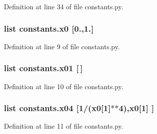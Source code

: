 Definition at line 34 of file constants.\-py.

\hypertarget{namespaceconstants_a8bd1a0146a51ce5d2a094e0390ad9d6e}{
\subsubsection[{x0}]{\setlength{\rightskip}{0pt plus 5cm}list constants.\-x0 \mbox{[}0.,1.\mbox{]}}}\label{namespaceconstants_a8bd1a0146a51ce5d2a094e0390ad9d6e}


Definition at line 9 of file constants.\-py.

\hypertarget{namespaceconstants_aba7f89394c33cc1f4a503e8e7717fd15}{
\subsubsection[{x01}]{\setlength{\rightskip}{0pt plus 5cm}list constants.\-x01 \mbox{[}$\,$\mbox{]}}}\label{namespaceconstants_aba7f89394c33cc1f4a503e8e7717fd15}


Definition at line 10 of file constants.\-py.

\hypertarget{namespaceconstants_a8e11ebfc367fa217f4a4a97b1cace351}{
\subsubsection[{x04}]{\setlength{\rightskip}{0pt plus 5cm}list constants.\-x04 \mbox{[}1/({\bf x0}\mbox{[}1\mbox{]}$\ast$$\ast$4),{\bf x0}\mbox{[}1\mbox{]} \mbox{]}}}\label{namespaceconstants_a8e11ebfc367fa217f4a4a97b1cace351}


Definition at line 11 of file constants.\-py.

